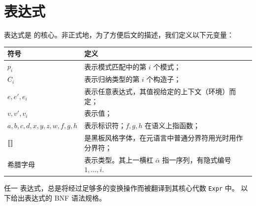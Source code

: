 \section{表达式}
表达式是 \Tigris 的核心。非正式地，为了方便后文的描述，我们定义以下元变量：
\begin{table}[H]
  \begin{tabularx}{\linewidth}{@{}lX@{}}
    \toprule
    \textbf{符号}     & \textbf{定义}   \\ \midrule
    \(p_i\) & 表示模式匹配中的第 \(i\) 个模式；          \\
    \(C_i\)         & 表示归纳类型的第 $i$ 个构造子；          \\
    \(e, e', e_i\)             & 表示任意表达式，其值视给定的上下文（环境）而定；   \\
    \(v, v', v_i\)               & 表示值；          \\
    \(a, b, c, d, x, y, z, w, f, g, h\) & 表示标识符；$f,g,h$ 在语义上指函数；        \\
    \(\llbracket  \rrbracket\)            & 是黑板风格字体，在元语言中普通分界符用光时用作分界符； \\
    希腊字母   & 表示类型。其上一横杠 \(\bar{\alpha}\) 指一序列，有隐式编号 \(1,\dots,i\). \\ \bottomrule
  \end{tabularx}
\end{table}
任一 \Tigris 表达式，总是将经过足够多的变换操作而被翻译到其核心代数 \texttt{Expr} 中。
以下给出表达式的 BNF 语法规格。
